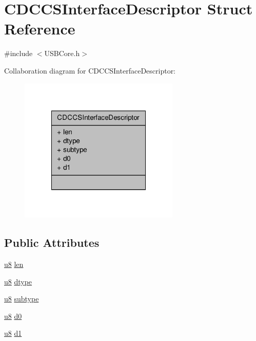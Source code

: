 \hypertarget{struct_c_d_c_c_s_interface_descriptor}{\section{C\-D\-C\-C\-S\-Interface\-Descriptor Struct Reference}
\label{struct_c_d_c_c_s_interface_descriptor}
}


{\ttfamily \#include $<$U\-S\-B\-Core.\-h$>$}



Collaboration diagram for C\-D\-C\-C\-S\-Interface\-Descriptor\-:
\nopagebreak
\begin{figure}[H]
\begin{center}
\leavevmode
\includegraphics[width=216pt]{struct_c_d_c_c_s_interface_descriptor__coll__graph}
\end{center}
\end{figure}
\subsection*{Public Attributes}
\begin{DoxyCompactItemize}
\item 
\hyperlink{_platform_8h_aed742c436da53c1080638ce6ef7d13de}{u8} \hyperlink{struct_c_d_c_c_s_interface_descriptor_a4898e456596cc2351587e6f8313f0135}{len}
\item 
\hyperlink{_platform_8h_aed742c436da53c1080638ce6ef7d13de}{u8} \hyperlink{struct_c_d_c_c_s_interface_descriptor_a40eb77b74991465abcdbf3cfda5cb4fc}{dtype}
\item 
\hyperlink{_platform_8h_aed742c436da53c1080638ce6ef7d13de}{u8} \hyperlink{struct_c_d_c_c_s_interface_descriptor_a9ba536afa860b01eff6b0da6f31a5445}{subtype}
\item 
\hyperlink{_platform_8h_aed742c436da53c1080638ce6ef7d13de}{u8} \hyperlink{struct_c_d_c_c_s_interface_descriptor_a8354e45c15df0e06cc72b35d6cea23f5}{d0}
\item 
\hyperlink{_platform_8h_aed742c436da53c1080638ce6ef7d13de}{u8} \hyperlink{struct_c_d_c_c_s_interface_descriptor_a1c4fa9ab196fe4731d541f8abcefa36a}{d1}
\end{DoxyCompactItemize}



